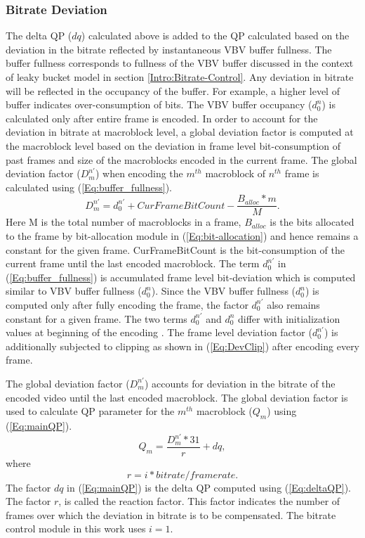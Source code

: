 \documentclass[11pt]{article} %
\begin{document}
\subsubsection{Bitrate Deviation}
	The delta QP ($dq$) calculated above is added to the QP calculated based on the deviation in the bitrate reflected by instantaneous VBV buffer fullness. The buffer fullness corresponds to fullness of the VBV buffer discussed in the context of leaky bucket model in section \ref{Intro:Bitrate-Control}. Any deviation in bitrate will be reflected in the occupancy of the buffer. For example, a higher level of buffer indicates over-consumption of bits. The VBV buffer occupancy ($d_0^n$) is calculated only after entire frame is encoded. In order to account for the deviation in bitrate at macroblock level, a global deviation factor is computed at the macroblock level based on the deviation in frame level bit-consumption of past frames and size of the macroblocks encoded in the current frame. The global deviation factor ($D_m^{n'}$) when encoding the $m^{th}$ macroblock of $n^{th}$ frame is calculated using (\ref{Eq:buffer_fullness}).
\begin{equation}
	\label{Eq:buffer_fullness}
	D_m^{n'} = d_0^{n'} + CurFrameBitCount - \frac{B_{alloc} * m}{M}.
\end{equation}
Here M is the total number of macroblocks in a frame, $B_{alloc}$ is the bits allocated to the frame by bit-allocation module in (\ref{Eq:bit-allocation}) and hence remains a constant for the given frame. CurFrameBitCount is the bit-consumption of the current frame until the last encoded macroblock. The term $d_0^{n'}$ in (\ref{Eq:buffer_fullness}) is accumulated frame level bit-deviation which is computed similar to VBV buffer fullness ($d_0^n$). Since the VBV buffer fullness ($d_0^n$) is computed only after fully encoding the frame, the factor $d_0^{n'}$ also remains constant for a given frame. The two terms $d_0^{n'}$ and $d_0^n$ differ with initialization values at beginning of the encoding \cite{JVTF086}. The frame level deviation factor ($d_0^{n'}$) is additionally subjected to clipping as shown in (\ref{Eq:DevClip}) after encoding every frame. 

The global deviation factor ($D_m^{n'}$) accounts for deviation in the bitrate of the encoded video until the last encoded macroblock. The global deviation factor is used to calculate QP parameter for the $m^{th}$ macroblock ($Q_m$) using (\ref{Eq:mainQP}).
\begin{equation}
	\label{Eq:mainQP}
	Q_m = \frac{D_m^{n'} * 31}{r} + dq,
\end{equation}
where
\begin{equation}
 r = i * bitrate/framerate \nonumber.
\end{equation}
The factor $dq$ in (\ref{Eq:mainQP}) is the delta QP computed using (\ref{Eq:deltaQP}). The factor $r$, is called the reaction factor. This factor indicates the number of frames over which the deviation in bitrate is to be compensated. The bitrate control module in this work uses $i = 1$.
\end{document}
